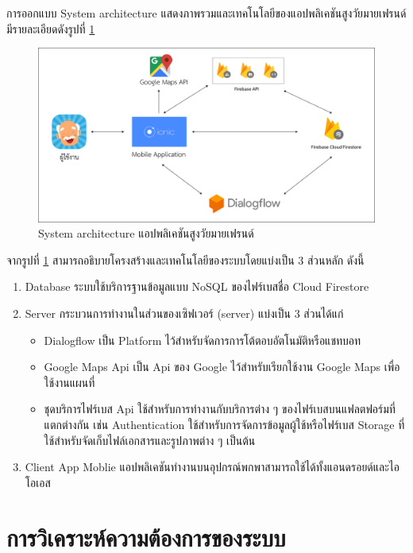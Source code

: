     การออกแบบ System architecture แสดงภาพรวมและเทคโนโลยีของแอปพลิเคชันสูงวัยมายเฟรนด์ มีรายละเอียดดังรูปที่ \ref{Fig:architecture}
   	\begin{figure}[H]
   		\centering
   		\includegraphics[width=\textwidth]{Figures/3/architecture/structure_app}
   		\caption{System architecture แอปพลิเคชันสูงวัยมายเฟรนด์}
   		\label{Fig:architecture}
   	\end{figure}
   
   จากรูปที่ \ref{Fig:architecture} สามารถอธิบายโครงสร้างและเทคโนโลยีของระบบโดยแบ่งเป็น 3 ส่วนหลัก ดังนี้
   \begin{enumerate}
   	\item Database
   	 ระบบใช้บริการฐานข้อมูลแบบ NoSQL ของไฟร์เบสชื่อ Cloud Firestore
	  \item Server
	   กระบวนการทำงานในส่วนของเซิฟเวอร์ (server) แบ่งเป็น 3 ส่วนได้แก่
	   \begin{itemize}
	   	\item Dialogflow เป็น Platform ไว้สำหรับจัดการการโต้ตอบอัตโนมัติหรือแชทบอท
	   	\item Google Maps Api เป็น Api ของ Google ไว้สำหรับเรียกใช้งาน Google Maps เพื่อใช้งานแผนที่
	   	\item ชุดบริการไฟร์เบส Api ใช้สำหรับการทำงานกับบริการต่าง ๆ ของไฟร์เบสบนแฟลตฟอร์มที่แตกต่างกัน เช่น Authentication ใช้สำหรับการจัดการข้อมูลผู้ใช้หรือไฟร์เบส Storage ที่ใช้สำหรับจัดเก็บไฟล์เอกสารและรูปภาพต่าง ๆ เป็นต้น
	   \end{itemize}
	   \item Client
	    App Moblie แอปพลิเคชันทำงานบนอุปกรณ์พกพาสามารถใช้ได้ทั้งแอนดรอยด์และไอโอเอส
   \end{enumerate}



\section{การวิเคราะห์ความต้องการของระบบ}
